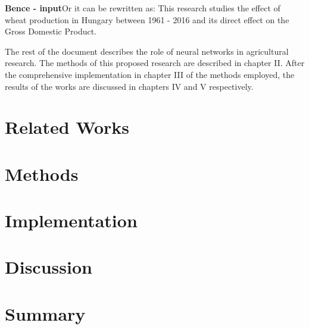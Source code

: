 \documentclass[
]{thesis-ekf}
\begin{document}
\textbf{Bence - input}Or it can be rewritten as: This research studies the effect of wheat production in Hungary between 1961 - 2016 and its direct effect on the Gross Domestic Product.

The rest of the document describes the role of neural networks in agricultural research. The methods of this proposed research are described in chapter II. After the comprehensive implementation in chapter III of the methods employed, the results of the works are discussed in chapters IV and V respectively.





\chapter{Related Works}



\chapter{Methods}



\chapter{Implementation}



\chapter{Discussion}




\chapter{Summary}








\end{document}

